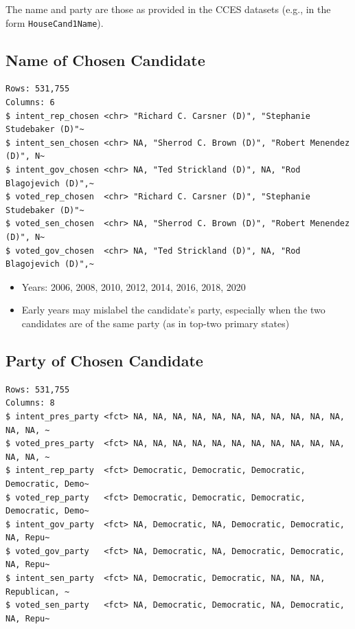 \documentclass[10pt,article,oneside]{memoir}
\theoremstyle{definition}
\begin{document}
The name and party are those as provided in the CCES datasets (e.g., in
the form \texttt{HouseCand1Name}).

\hypertarget{name-of-chosen-candidate}{%
\subsection{Name of Chosen Candidate}\label{name-of-chosen-candidate}}

\begin{verbatim}
Rows: 531,755
Columns: 6
$ intent_rep_chosen <chr> "Richard C. Carsner (D)", "Stephanie Studebaker (D)"~
$ intent_sen_chosen <chr> NA, "Sherrod C. Brown (D)", "Robert Menendez (D)", N~
$ intent_gov_chosen <chr> NA, "Ted Strickland (D)", NA, "Rod Blagojevich (D)",~
$ voted_rep_chosen  <chr> "Richard C. Carsner (D)", "Stephanie Studebaker (D)"~
$ voted_sen_chosen  <chr> NA, "Sherrod C. Brown (D)", "Robert Menendez (D)", N~
$ voted_gov_chosen  <chr> NA, "Ted Strickland (D)", NA, "Rod Blagojevich (D)",~
\end{verbatim}

\begin{itemize}
\tightlist
\item
  Years: 2006, 2008, 2010, 2012, 2014, 2016, 2018, 2020
\item
  Early years may mislabel the candidate's party, especially when the
  two candidates are of the same party (as in top-two primary states)
\end{itemize}

\hypertarget{party-of-chosen-candidate}{%
\subsection{Party of Chosen Candidate}\label{party-of-chosen-candidate}}

\begin{verbatim}
Rows: 531,755
Columns: 8
$ intent_pres_party <fct> NA, NA, NA, NA, NA, NA, NA, NA, NA, NA, NA, NA, NA, ~
$ voted_pres_party  <fct> NA, NA, NA, NA, NA, NA, NA, NA, NA, NA, NA, NA, NA, ~
$ intent_rep_party  <fct> Democratic, Democratic, Democratic, Democratic, Demo~
$ voted_rep_party   <fct> Democratic, Democratic, Democratic, Democratic, Demo~
$ intent_gov_party  <fct> NA, Democratic, NA, Democratic, Democratic, NA, Repu~
$ voted_gov_party   <fct> NA, Democratic, NA, Democratic, Democratic, NA, Repu~
$ intent_sen_party  <fct> NA, Democratic, Democratic, NA, NA, NA, Republican, ~
$ voted_sen_party   <fct> NA, Democratic, Democratic, NA, Democratic, NA, Repu~
\end{verbatim}
\end{document}
